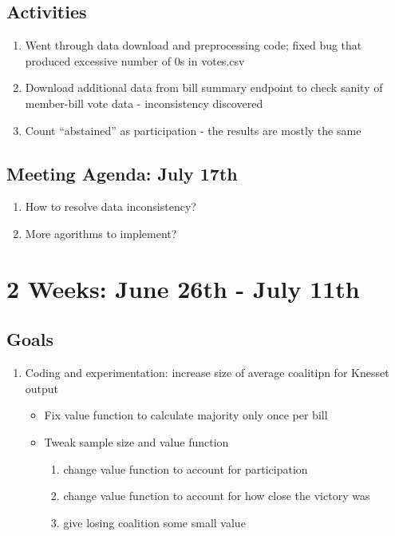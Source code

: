 \documentclass[a4paper]{article}
\begin{document}
\subsection*{Activities}

\begin{enumerate}
  \item Went through data download and preprocessing code; fixed bug that produced excessive number of 0s in votes.csv
  \item Download additional data from bill summary endpoint to check sanity of member-bill vote data - inconsistency discovered
  \item Count ``abstained'' as participation - the results are mostly the same
\end{enumerate}

\subsection*{Meeting Agenda: July 17th}

\begin{enumerate}
  \item How to resolve data inconsistency?
  \item More agorithms to implement?
\end{enumerate}

\section*{2 Weeks: June 26th - July 11th}

\subsection*{Goals}

\begin{enumerate}
  \item Coding and experimentation: increase size of average coalitipn for Knesset output
  \begin{itemize}
    \item Fix value function to calculate majority only once per bill
    \item Tweak sample size and value function
    \begin{enumerate}
      \item change value function to account for participation
      \item change value function to account for how close the victory was
      \item give losing coalition some small value
    \end{enumerate}
  \end{itemize}
\end{enumerate}
\end{document}
